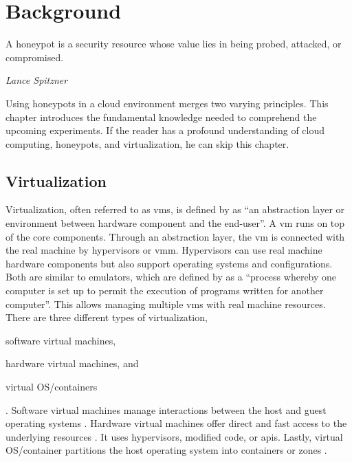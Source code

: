 \chapter{Background}
\label{chap:background}

\epigraph{A honeypot is a security resource whose value lies in being probed, attacked, or compromised.}{\textit{Lance Spitzner}}

Using honeypots in a cloud environment merges two varying principles.
This chapter introduces the fundamental knowledge needed to comprehend the upcoming experiments.
If the reader has a profound understanding of cloud computing, honeypots, and virtualization, he can skip this chapter.

\section{Virtualization}

Virtualization, often referred to as \acp{vm}, is defined by \citet{kreuter2004} as \enquote{an abstraction layer or environment between hardware component and the end-user}.
A \ac{vm} runs on top of the  core components.
Through an abstraction layer, the \acl{vm} is connected with the real machine by hypervisors or \ac{vmm}.
Hypervisors can use real machine hardware components but also support  operating systems and configurations.
Both are similar to emulators, which are defined by \citet{lichstei1969} as a \enquote{process whereby one computer is set up to permit the execution of programs written for another computer}.
This allows managing multiple \acp{vm} with real machine resources.
There are three different types of virtualization,
\begin{enumerate*}[label=(\roman*)]
    \item software virtual machines,
    \item hardware virtual machines, and
    \item virtual OS/containers
\end{enumerate*}.
Software virtual machines manage interactions between the host and guest operating systems \cite{daniels2009}.
Hardware virtual machines offer direct and fast access to the underlying resources \cite{daniels2009}.
It uses hypervisors, modified code, or \acp{api}.
Lastly, virtual OS/container partitions the host operating system into containers or zones \cite{daniels2009}.


